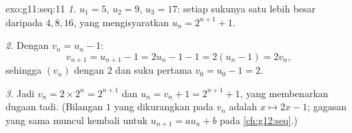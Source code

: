 \begin{solution}{exo:g11:seq:11}
\emph{1.} $u_1 = 5$, $u_2 = 9$, $u_3 = 17$: setiap sukunya satu lebih besar
daripada $4, 8, 16$, yang mengisyaratkan $u_n = 2^{n+1} + 1$.

\emph{2.} Dengan $v_n = u_n - 1$:
\[
v_{n+1} = u_{n+1} - 1 = 2u_n - 1 - 1 = 2(u_n - 1) = 2v_n,
\]
sehingga $(v_n)$  dengan  $2$ dan suku pertama
$v_0 = u_0 - 1 = 2$.

\emph{3.} Jadi $v_n = 2 \times 2^n = 2^{n+1}$ dan
$u_n = v_n + 1 = 2^{n+1} + 1$, yang membenarkan dugaan tadi. (Bilangan $1$
yang dikurangkan pada $v_n$ adalah  $x \mapsto 2x - 1$; gagasan
yang sama muncul kembali untuk $u_{n+1} = au_n + b$ pada \cref{ch:g12:seq}.)
\end{solution}

